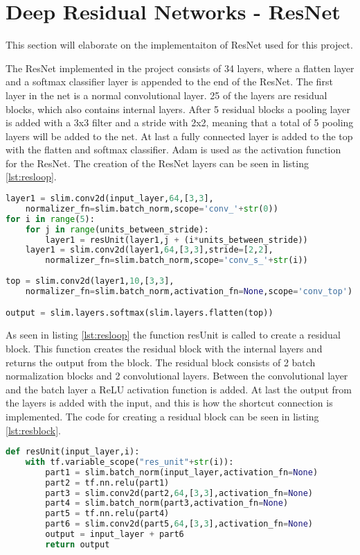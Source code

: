 \section{Deep Residual Networks - ResNet}

This section will elaborate on the implementaiton of ResNet used for this project.

The ResNet implemented in the project consists of 34 layers, where a flatten layer and a softmax classifier layer is appended to the end of the ResNet. The first layer in the net is a normal convolutional layer. 25 of the layers are residual blocks, which also contains internal layers. After 5 residual blocks a pooling layer is added with a 3x3 filter and a stride with 2x2, meaning that a total of 5 pooling layers will be added to the net. At last a fully connected layer is added to the top with the flatten and softmax classifier. Adam is used as the activation function for the ResNet. The creation of the ResNet layers can be seen in listing \ref{lst:resloop}.

\begin{lstlisting}[language=Python, label=lst:resloop, caption=For loop that creates the layers in the ResNet]
layer1 = slim.conv2d(input_layer,64,[3,3],
	normalizer_fn=slim.batch_norm,scope='conv_'+str(0))
for i in range(5):
    for j in range(units_between_stride):
        layer1 = resUnit(layer1,j + (i*units_between_stride))
    layer1 = slim.conv2d(layer1,64,[3,3],stride=[2,2],
    	normalizer_fn=slim.batch_norm,scope='conv_s_'+str(i))
    
top = slim.conv2d(layer1,10,[3,3],
	normalizer_fn=slim.batch_norm,activation_fn=None,scope='conv_top')

output = slim.layers.softmax(slim.layers.flatten(top))
\end{lstlisting}

As seen in listing \ref{lst:resloop} the function resUnit is called to create a residual block. This function creates the residual block with the internal layers and returns the output from the block. The residual block consists of 2 batch normalization blocks and 2 convolutional layers. Between the convolutional layer and the batch layer a ReLU activation function is added. At last the output from the layers is added with the input, and this is how the shortcut connection is implemented. The code for creating a residual block can be seen in listing \ref{lst:resblock}.

\begin{lstlisting}[language=Python, label=lst:resblock, caption=resUnit function that creates the residual block]
def resUnit(input_layer,i):
    with tf.variable_scope("res_unit"+str(i)):
        part1 = slim.batch_norm(input_layer,activation_fn=None)
        part2 = tf.nn.relu(part1)
        part3 = slim.conv2d(part2,64,[3,3],activation_fn=None)
        part4 = slim.batch_norm(part3,activation_fn=None)
        part5 = tf.nn.relu(part4)
        part6 = slim.conv2d(part5,64,[3,3],activation_fn=None)
        output = input_layer + part6
        return output
\end{lstlisting}

